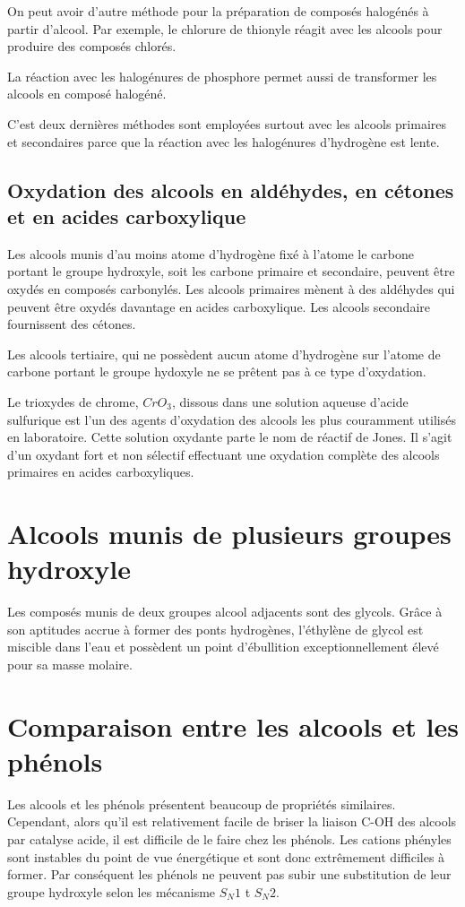 On peut avoir d'autre méthode pour la préparation de composés halogénés à partir d'alcool.
Par exemple, le chlorure de thionyle réagit avec les alcools pour produire des composés chlorés.

La réaction avec les halogénures de phosphore permet aussi de transformer les alcools en composé halogéné.

C'est deux dernières méthodes sont employées surtout avec les alcools primaires et secondaires parce que la réaction avec les halogénures d'hydrogène est lente.

\subsection{Oxydation des alcools en aldéhydes, en cétones et en acides carboxylique}
Les alcools munis d'au moins atome d'hydrogène fixé à l'atome le carbone portant le groupe hydroxyle, soit les carbone primaire et secondaire, peuvent être oxydés en composés carbonylés.
Les alcools primaires mènent à des aldéhydes qui peuvent être oxydés davantage en acides carboxylique.
Les alcools secondaire fournissent des cétones.



Les alcools tertiaire, qui ne possèdent aucun atome d'hydrogène sur l'atome de carbone portant le groupe hydoxyle ne se prêtent pas à ce type d'oxydation.


Le trioxydes de chrome, $CrO_3$, dissous dans une solution aqueuse  d'acide sulfurique est l'un des agents d'oxydation des alcools les plus couramment utilisés en laboratoire.
Cette solution oxydante parte le nom de réactif de Jones.
Il s'agit d'un oxydant fort et non sélectif effectuant une oxydation complète des alcools primaires en acides carboxyliques.

\section{Alcools munis de plusieurs groupes hydroxyle}

Les composés munis de deux groupes alcool adjacents sont des glycols.
Grâce à son aptitudes accrue à former des ponts hydrogènes, l'éthylène de glycol est miscible dans l'eau et possèdent un point d'ébullition exceptionnellement élevé pour sa masse molaire.



\section{ Comparaison entre les alcools et les phénols}
Les alcools et les phénols présentent beaucoup de propriétés similaires.
Cependant, alors qu'il est relativement facile de briser la liaison C-OH des alcools par catalyse acide, il est difficile de le faire chez les phénols.
Les cations phényles sont instables du point de vue énergétique et sont donc extrêmement difficiles à former.
Par conséquent les phénols ne peuvent pas  subir une substitution de leur groupe hydroxyle selon les mécanisme $S_N1$ t $S_N2$.

